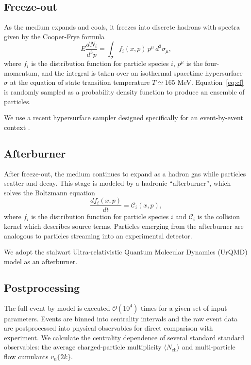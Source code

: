 \documentclass[aps,prc,reprint,superscriptaddress,amsmath]{revtex4-1}
\newcommand{\avg}[1]{\langle #1 \rangle}
\newcommand{\nch}{N_\text{ch}}
\newcommand{\vnk}[2]{v_#1\{#2\}}
\begin{document}
\subsection{Freeze-out}

As the medium expands and cools, it freezes into discrete hadrons with spectra given by the Cooper-Frye formula \cite{Cooper:1974mv}
\begin{equation}
  E \frac{dN_i}{d^3p} = \int_\sigma f_i(x,p) \, p^\mu \, d^3\sigma_\mu,
  \label{eq:cf}
\end{equation}
where $f_i$ is the distribution function for particle species $i$, $p^\mu$ is the four-momentum, and the integral is taken over an isothermal spacetime hypersurface $\sigma$ at the equation of state transition temperature $T \simeq 165$ MeV.
Equation~\eqref{eq:cf} is randomly sampled as a probability density function to produce an ensemble of particles.

We use a recent hypersurface sampler designed specifically for an event-by-event context \cite{Qiu:2013wca,Shen:2014vra}.

\subsection{Afterburner}

After freeze-out, the medium continues to expand as a hadron gas while particles scatter and decay.
This stage is modeled by a hadronic ``afterburner'', which solves the Boltzmann equation
\begin{equation}
  \frac{df_i(x,p)}{dt} = \mathcal C_i(x,p),
\end{equation}
where $f_i$ is the distribution function for particle species $i$ and $\mathcal C_i$ is the collision kernel which describes source terms.
Particles emerging from the afterburner are analogous to particles streaming into an experimental detector.

We adopt the stalwart Ultra-relativistic Quantum Molecular Dynamics (UrQMD) model \cite{Bass:1998ca,Bleicher:1999xi} as an afterburner.

\subsection{Postprocessing}

The full event-by-model is executed $\mathcal O(10^4)$ times for a given set of input parameters.
Events are binned into centrality intervals and the raw event data are postprocessed into physical observables for direct comparison with experiment.
We calculate the centrality dependence of several standard standard observables:
the average charged-particle multiplicity $\avg\nch$ and multi-particle flow cumulants $\vnk n {2k}$.
\end{document}

